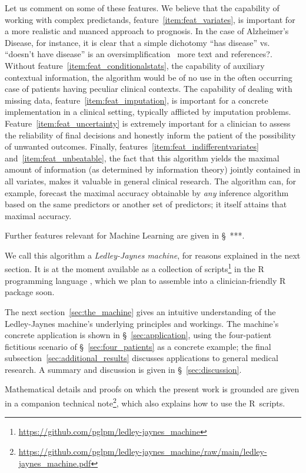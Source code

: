 \documentclass[utf8]{FrontiersinHarvard} %
\newcommand*{\pencil}{{\fontencoding{U}\fontfamily{fontawesometwo}\selectfont\symbol{210}}}
\newcommand{\mynotep}[1]{{\color{notecolour}\pencil\ #1}}
\newcommand*{\sect}{\S}%
\renewcommand*{\|}[1][]{\nonscript\:#1\vert\nonscript\:\mathopen{}}
\newcommand*{\ad}{Alzheimer's Disease}
\newcommand*{\ljm}{Ledley-Jaynes machine}
\begin{document}
Let us comment on some of these features. We believe that the capability of working with complex predictands, feature~\ref{item:feat_variates}, is important for a more realistic and nuanced approach to prognosis. In the case of \ad, for instance, it is clear that a simple dichotomy \enquote{has disease} vs. \enquote{doesn't have disease} is an oversimplification \mynotep{more text and references?}. Without feature~\ref{item:feat_conditionalstats}, the capability of auxiliary contextual information, the algorithm would be of no use in the often occurring case of patients having peculiar clinical contexts. The capability of dealing with missing data, feature~\ref{item:feat_imputation}, is important for a concrete implementation in a clinical setting, typically afflicted by imputation problems. Feature~\ref{item:feat_uncertainty} is extremely important for a clinician to assess the reliability of final decisions and honestly inform the patient of the possibility of unwanted outcomes. Finally, features~\ref{item:feat_indifferentvariates} and~\ref{item:feat_unbeatable}, the fact that this algorithm yields the maximal amount of information (as determined by information theory) jointly contained in all variates, makes it valuable in general clinical research. The algorithm can, for example, forecast the maximal accuracy obtainable by \emph{any} inference algorithm based on the same predictors or another set of predictors; it itself attains that maximal accuracy.

Further features relevant for Machine Learning are given in \sect\mynotep{***}.

We call this algorithm a \emph{\ljm}, for reasons explained in the next section. It is at the moment available as a collection of scripts\footnote{\url{https://github.com/pglpm/ledley-jaynes\_machine}} in the R programming language \citep{rcoreteam1995_r2023}, which we plan to assemble into a clinician-friendly R package soon.

The next section~\ref{sec:the_machine} gives an intuitive understanding of the \ljm's underlying principles and workings. The machine's concrete application is shown in \sect~\ref{sec:application}, using the four-patient fictitious scenario of \sect~\ref{sec:four_patients} as a concrete example; the final subsection~\ref{sec:additional_results} discusses applications to general medical research. A summary and discussion is given in \sect~\ref{sec:discussion}.

Mathematical details and proofs on which the present work is grounded are given in a companion technical note\footnote{\url{https://github.com/pglpm/ledley-jaynes\_machine/raw/main/ledley-jaynes\_machine.pdf}}, which also explains how to use the R~scripts.
\end{document}
